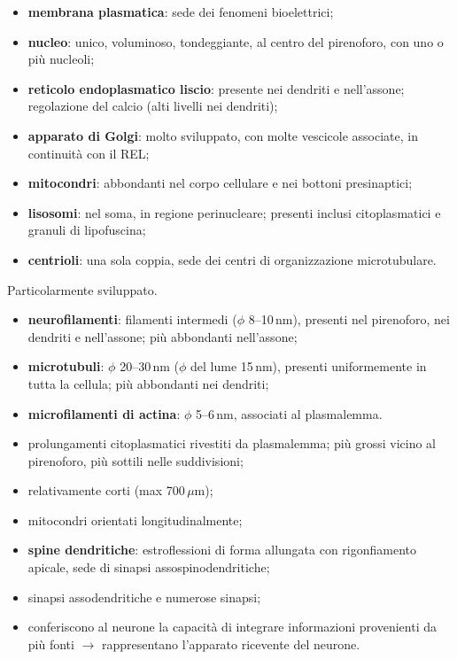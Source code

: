 \begin{itemize}
  \item \textbf{membrana plasmatica}: sede dei fenomeni bioelettrici;
  \item \textbf{nucleo}: unico, voluminoso, tondeggiante, al centro del pirenoforo, con uno o più nucleoli;
  \item \textbf{reticolo endoplasmatico liscio}: presente nei dendriti e nell'assone; regolazione del calcio (alti livelli nei dendriti);
  \item \textbf{apparato di Golgi}: molto sviluppato, con molte vescicole associate, in continuità con il REL;
  \item \textbf{mitocondri}: abbondanti nel corpo cellulare e nei bottoni presinaptici;
  \item \textbf{lisosomi}: nel soma, in regione perinucleare; presenti inclusi citoplasmatici e granuli di lipofuscina;
  \item \textbf{centrioli}: una sola coppia, sede dei centri di organizzazione microtubulare.
\end{itemize}

Particolarmente sviluppato.
\begin{itemize}
  \item \textbf{neurofilamenti}: filamenti intermedi ($\phi$ 8--10\,nm), presenti nel pirenoforo, nei dendriti e nell'assone; più abbondanti nell'assone;
  \item \textbf{microtubuli}: $\phi$ 20--30\,nm ($\phi$ del lume 15\,nm), presenti uniformemente in tutta la cellula; più abbondanti nei dendriti;
  \item \textbf{microfilamenti di actina}: $\phi$ 5--6\,nm, associati al plasmalemma.
\end{itemize}

\begin{itemize}
  \item prolungamenti citoplasmatici rivestiti da plasmalemma; più grossi vicino al pirenoforo, più sottili nelle suddivisioni;
  \item relativamente corti (max 700\,$\mu$m);
  \item mitocondri orientati longitudinalmente;
  \item \textbf{spine dendritiche}: estroflessioni di forma allungata con rigonfiamento apicale, sede di sinapsi assospinodendritiche;
  \item sinapsi assodendritiche e numerose sinapsi;
  \item conferiscono al neurone la capacità di integrare informazioni provenienti da più fonti $\rightarrow$ rappresentano l'apparato ricevente del neurone.
\end{itemize}

